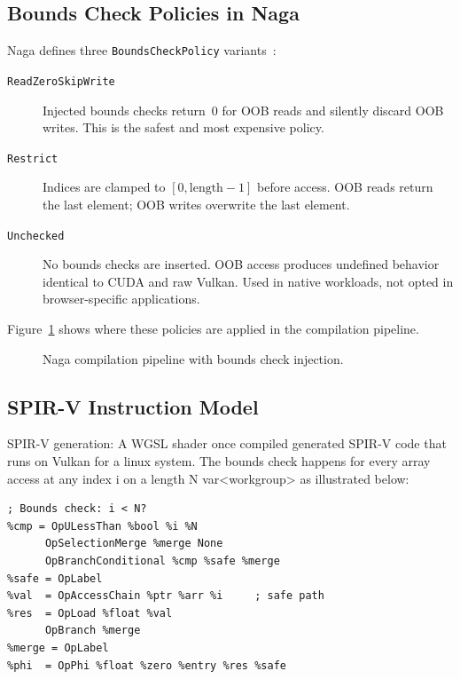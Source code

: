 \documentclass[11pt,a4paper]{article}
\begin{document}
\subsection{Bounds Check Policies in Naga}

Naga defines three \texttt{BoundsCheckPolicy} variants~\cite{naga_bounds_check}:

\begin{description}
  \item[\texttt{ReadZeroSkipWrite}] Injected bounds checks return~0 for OOB
  reads and silently discard OOB writes. This is the safest and most expensive
  policy.
  \item[\texttt{Restrict}] Indices are clamped to $[0, \text{length}-1]$
  before access. OOB reads return the last element; OOB writes overwrite the
  last element.
  \item[\texttt{Unchecked}] No bounds checks are inserted. OOB access produces
  undefined behavior identical to CUDA and raw Vulkan. Used in native workloads, not  opted in browser-specific applications.
\end{description}

Figure~\ref{fig:pipeline} shows where these policies are applied in the
compilation pipeline.

\begin{figure}[htbp]
\centering
{}
\caption{Naga compilation pipeline with bounds check injection.}
\label{fig:pipeline}
\end{figure}

\subsection{SPIR-V Instruction Model}

SPIR-V generation: A WGSL shader once compiled generated SPIR-V code that runs on Vulkan for a linux system. The bounds check happens for every array access at any index i on a length N var<workgroup>  as illustrated  below:  

\begin{lstlisting}
; Bounds check: i < N?
%cmp = OpULessThan %bool %i %N
      OpSelectionMerge %merge None
      OpBranchConditional %cmp %safe %merge
%safe = OpLabel
%val  = OpAccessChain %ptr %arr %i     ; safe path
%res  = OpLoad %float %val
      OpBranch %merge
%merge = OpLabel
%phi  = OpPhi %float %zero %entry %res %safe
\end{lstlisting}
\end{document}
